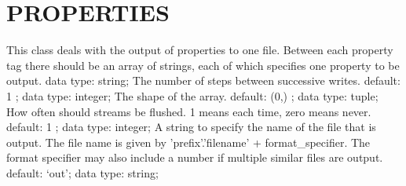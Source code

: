 \section{PROPERTIES}
\label{PROPERTIES}
\begin{ipifield}{}%
{This class deals with the output of properties to one file. Between each property tag there should be an array of strings, each of which specifies one property to be output.}%
{data type: string; }%
{%
{The number of steps between successive writes.}%
{default:  1 ; data type: integer; }%
%
{The shape of the array.}%
{default:  (0,) ; data type: tuple; }%
%
{How often should streams be flushed. 1 means each time, zero means never.}%
{default:  1 ; data type: integer; }%
%
{A string to specify the name of the file that is output. The file name is given by 'prefix'.'filename' + format\_specifier. The format specifier may also include a number if multiple similar files are output.}%
{default: `out'; data type: string; }%
}
\end{ipifield}
